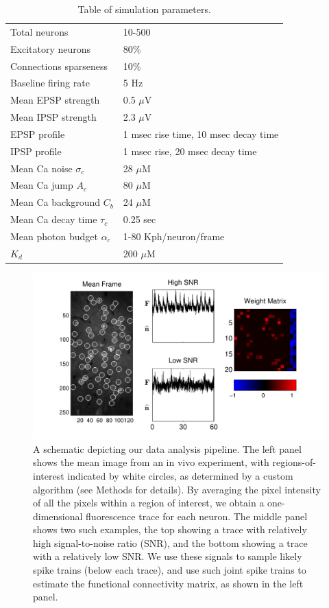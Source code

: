 \begin{table}[h!b!p!]
\caption{Table of simulation parameters.}\label{table:caparm}
\begin{tabular}{ll}
\hline
Total neurons & 10-500 \\
Excitatory neurons & 80\% \\
Connections sparseness & 10\% \\
Baseline firing rate & 5  Hz\\
Mean EPSP strength & 0.5 $\mu$V \\
Mean IPSP strength & 2.3 $\mu$V\\
EPSP profile & 1 msec rise time, 10 msec decay time \\
IPSP profile & 1 msec rise, 20 msec decay time \\
\hline
Mean Ca noise $\sigma_c$ & 28 $\mu$M \\
Mean Ca jump $A_c$ & 80 $\mu$M \\
Mean Ca background $C_b$ & 24 $\mu$M \\
Mean Ca decay time $\tau_c$ & 0.25 sec \\
Mean photon budget $\alpha_c$ & 1-80 Kph/neuron/frame \\
$K_d$ & 200 $\mu$M \\
\hline
\end{tabular}
\end{table}





\begin{figure}[h]
\centering
\includegraphics[width=\hsize]{../figs/data_example}
\caption{A schematic depicting our data analysis pipeline.  The left panel shows the mean image from an in vivo experiment, with regions-of-interest indicated by white circles, as determined by a custom algorithm (see Methods for details).  By averaging the pixel intensity of all the pixels within a region of interest, we obtain a one-dimensional fluorescence trace for each neuron.  The middle panel shows two such examples, the top showing a trace with relatively high signal-to-noise ratio (SNR), and the bottom showing a trace with a relatively low SNR.  We use these signals to sample likely spike trains (below each trace), and use such joint spike trains to estimate the functional connectivity matrix, as shown in the left panel.}
\label{fig:data_example}
\end{figure}


